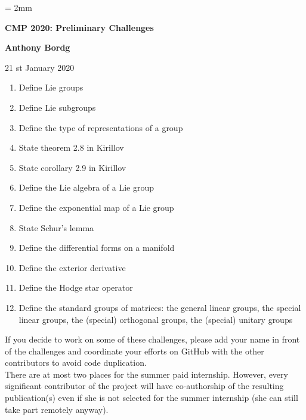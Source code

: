 \documentclass[12pt]{article}
\begin{document}
%
\parskip = 2mm
\begin{center}
{\bf\Large CMP 2020: Preliminary Challenges}

\vspace{3mm}

{\large\bf Anthony Bordg}
\vspace {3mm}

{21 st January 2020}  
\end{center}

\begin{enumerate}
	\item Define Lie groups	
	\item Define Lie subgroups
	\item Define the type of representations of a group
	\item State theorem 2.8 in Kirillov
	\item State corollary 2.9 in Kirillov
	\item Define the Lie algebra of a Lie group
	\item Define the exponential map of a Lie group
	\item State Schur's lemma
	\item Define the differential forms on a manifold
	\item Define the exterior derivative
	\item Define the Hodge star operator
	\item Define the standard groups of matrices: the general linear groups, the special linear groups, the (special) orthogonal groups, the (special) unitary groups
\end{enumerate}

If you decide to work on some of these challenges, please add your name in front of the challenges and coordinate your efforts on GitHub with the other contributors to avoid code duplication. \\
There are at most two places for the summer paid internship. However, every significant contributor of the project will have co-authorship of the resulting publication(s) even if she is not selected for the summer internship (she can still take part remotely anyway).
\end{document}
